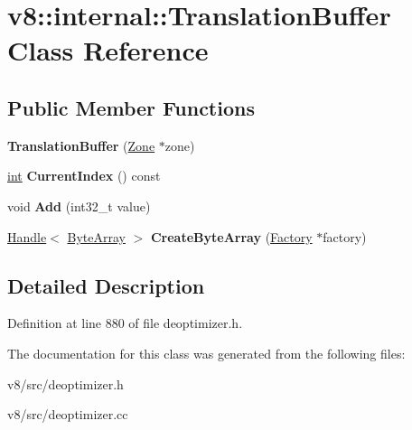 \hypertarget{classv8_1_1internal_1_1TranslationBuffer}{}\section{v8\+:\+:internal\+:\+:Translation\+Buffer Class Reference}
\label{classv8_1_1internal_1_1TranslationBuffer}
\subsection*{Public Member Functions}
\begin{DoxyCompactItemize}
\item 
\mbox{\label{classv8_1_1internal_1_1TranslationBuffer_aa4f23c3e15a32b3c6fe6c16348012073}} 
{\bfseries Translation\+Buffer} (\mbox{\hyperlink{classv8_1_1internal_1_1Zone}{Zone}} $\ast$zone)
\item 
\mbox{\label{classv8_1_1internal_1_1TranslationBuffer_a8333e4cd4706e571d6323c85b04e1cb9}} 
\mbox{\hyperlink{classint}{int}} {\bfseries Current\+Index} () const
\item 
\mbox{\label{classv8_1_1internal_1_1TranslationBuffer_a60d35c61396d8f6c1eac0e2175511cd7}} 
void {\bfseries Add} (int32\+\_\+t value)
\item 
\mbox{\label{classv8_1_1internal_1_1TranslationBuffer_a7392fb69b5e42583c45ec0d08fc08b52}} 
\mbox{\hyperlink{classv8_1_1internal_1_1Handle}{Handle}}$<$ \mbox{\hyperlink{classv8_1_1internal_1_1ByteArray}{Byte\+Array}} $>$ {\bfseries Create\+Byte\+Array} (\mbox{\hyperlink{classv8_1_1internal_1_1Factory}{Factory}} $\ast$factory)
\end{DoxyCompactItemize}


\subsection{Detailed Description}


Definition at line 880 of file deoptimizer.\+h.



The documentation for this class was generated from the following files\+:\begin{DoxyCompactItemize}
\item 
v8/src/deoptimizer.\+h\item 
v8/src/deoptimizer.\+cc\end{DoxyCompactItemize}
